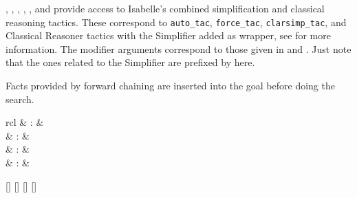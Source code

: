 \begin{isabellebody}
\begin{isamarkuptext}
\begin{description}
  \item \hyperlink{method.auto}{\mbox{}}, \hyperlink{method.force}{\mbox{}}, \hyperlink{method.clarsimp}{\mbox{}}, \hyperlink{method.fastsimp}{\mbox{}}, \hyperlink{method.slowsimp}{\mbox{}}, and \hyperlink{method.bestsimp}{\mbox{}} provide access
  to Isabelle's combined simplification and classical reasoning
  tactics.  These correspond to \verb|auto_tac|, \verb|force_tac|, \verb|clarsimp_tac|, and Classical Reasoner tactics with the Simplifier
  added as wrapper, see \cite{isabelle-ref} for more information.  The
  modifier arguments correspond to those given in
   and .  Just note that
  the ones related to the Simplifier are prefixed by 
  here.

  Facts provided by forward chaining are inserted into the goal before
  doing the search.

  \end{description}%
\end{isamarkuptext}%
\isamarkuptrue%
%
\isamarkuptrue%
%
\begin{isamarkuptext}%
\begin{matharray}{rcl}
    \hypertarget{method.rule}{\hyperlink{method.rule}{\mbox{}}} & : &  \\
    \hypertarget{method.contradiction}{\hyperlink{method.contradiction}{\mbox{}}} & : &  \\
    \hypertarget{method.intro}{\hyperlink{method.intro}{\mbox{}}} & : &  \\
    \hypertarget{method.elim}{\hyperlink{method.elim}{\mbox{}}} & : &  \\
  \end{matharray}

  \begin{railoutput}
\rail@bar
{}[]
[]
[]
\rail@endbar
\rail@bar
{}
[]
\rail@endbar
\rail@end
\end{railoutput}



\end{isamarkuptext}
\end{isabellebody}
